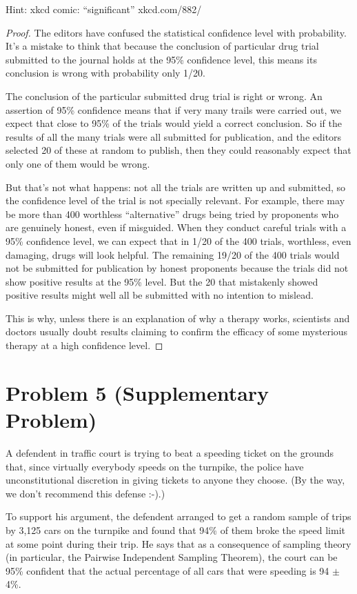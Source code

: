 \documentclass[14pt]{extarticle}
\begin{document}
Hint: xkcd comic: “significant” xkcd.com/882/

\begin{proof}
The editors have confused the statistical confidence level with probability. It’s a mistake to think that because the conclusion of particular drug trial submitted to the journal holds at the
95\% confidence level, this means its conclusion is wrong with probability only 1/20.

The conclusion of the particular submitted drug trial is right or wrong. An assertion of 95\% confidence means that if very many trails were carried out, we expect that close to 95\% of the
trials would yield a correct conclusion. So if the results of all the many trials were all submitted for publication, and the editors selected 20 of these at random to publish, then they could reasonably expect that only one of them would be wrong.

But that’s not what happens: not all the trials are written up and submitted, so the confidence level of the trial is not specially relevant. For example, there may be more than 400 worthless “alternative” drugs being tried by proponents who are genuinely honest, even if misguided. When they conduct careful trials with a 95\% confidence level, we can expect that in 1/20 of the 400 trials, worthless, even damaging, drugs will look helpful. The remaining 19/20 of the 400 trials would not be submitted for publication by honest proponents because the trials did not show pos­itive results at the 95\% level. But the 20 that mistakenly showed positive results might well all be submitted with no intention to mislead.

This is why, unless there is an explanation of why a therapy works, scientists and doctors usually doubt results claiming to confirm the efficacy of some mysterious therapy at a high confidence level.
\end{proof}

\section{Problem 5 (Supplementary Problem)}
A defendent in traffic court is trying to beat a speeding ticket on the grounds that, since virtually everybody speeds on the turnpike, the police have unconstitutional discretion in giving tickets to anyone they choose. (By the way, we don’t recommend this defense :-).)

To support his argument, the defendent arranged to get a random sample of trips by 3,125 cars on the turnpike and found that 94\% of them broke the speed limit at some point during their trip. He says that as a consequence of sampling theory (in particular, the Pairwise Independent Sampling Theorem), the court can be 95\% confident that the actual percentage of all cars that were speeding is 94 $\pm$ 4\%.
\end{document}

